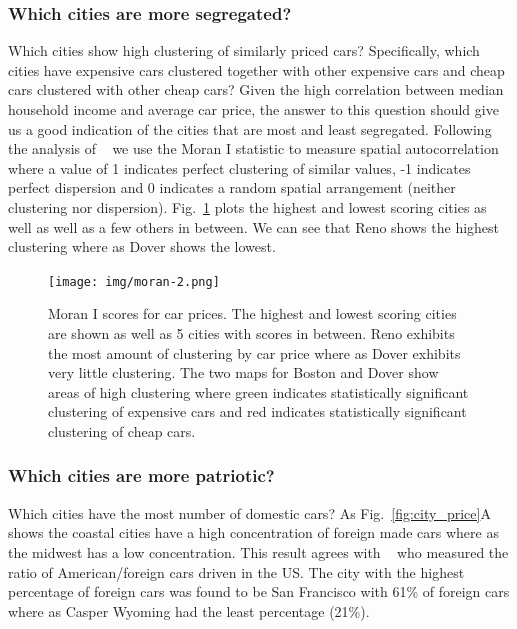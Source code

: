 \documentclass[10pt,twocolumn,letterpaper]{article}
\begin{document}
\subsubsection{Which cities are more segregated?}
Which cities show high clustering of similarly priced cars? Specifically, which cities have expensive cars clustered together with other expensive cars and cheap cars clustered with other cheap cars? Given the high correlation between median household income and average car price, the answer to this question should give us a good indication of the cities that are most and least segregated. Following the analysis of ~\cite{mit_plos_1} we use the Moran I statistic to measure spatial autocorrelation where a value of 1 indicates perfect clustering of similar values, -1 indicates perfect dispersion and 0 indicates a random spatial arrangement (neither clustering nor dispersion). Fig.~\ref{fig:moran-i} plots the highest and lowest scoring cities as well as well as a few others in between. We can see that Reno shows the highest clustering where as Dover shows the lowest.

\begin{figure}[t]
\begin{center}
    \texttt{[image: img/moran-2.png]}
\end{center}
   \caption {Moran I scores for car prices. The highest and lowest scoring cities are shown as well as 5 cities with scores in between. Reno exhibits the most amount of clustering by car price where as Dover exhibits very little clustering. The two maps for Boston and Dover show areas of high clustering where green indicates statistically significant clustering of expensive cars and red indicates statistically significant clustering of cheap cars.} 
\label{fig:moran-i}
\end{figure}

\subsubsection{Which cities are more patriotic?}
Which cities have the most number of domestic cars? As Fig.~\ref{fig:city_price}A shows the coastal cities have a high concentration of foreign made cars where as the midwest has a low concentration. This result agrees with ~\cite{foreign_domestic} who measured the ratio of American/foreign cars driven in the US. The city with the highest percentage of foreign cars was found to be San Francisco with 61\% of foreign cars where as Casper Wyoming had the least percentage (21\%).
\end{document}
